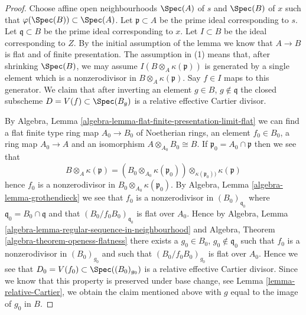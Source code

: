 \begin{proof}
Choose affine open neighbourhoods $\Spec(A)$ of $s$ and
$\Spec(B)$ of $x$ such that
$\varphi(\Spec(B)) \subset \Spec(A)$.
Let $\mathfrak p \subset A$ be the prime ideal corresponding to $s$.
Let $\mathfrak q \subset B$ be the prime ideal corresponding to $x$.
Let $I \subset B$ be the ideal corresponding to $Z$.
By the initial assumption of the lemma we know that
$A \to B$ is flat and of finite presentation.
The assumption in (1) means that, after shrinking $\Spec(B)$, we may
assume $I(B \otimes_A \kappa(\mathfrak p))$ is generated by a single
element which is a nonzerodivisor in $B \otimes_A \kappa(\mathfrak p)$.
Say $f \in I$ maps to this generator. We claim that after inverting
an element $g \in B$, $g \not \in \mathfrak q$ the closed subscheme
$D = V(f) \subset \Spec(B_g)$ is a relative effective Cartier
divisor.

\medskip\noindent
By
Algebra, Lemma \ref{algebra-lemma-flat-finite-presentation-limit-flat}
we can find a flat finite type ring map $A_0 \to B_0$ of Noetherian
rings, an element $f_0 \in B_0$, a ring map $A_0 \to A$ and an isomorphism
$A \otimes_{A_0} B_0 \cong B$. If $\mathfrak p_0 = A_0 \cap \mathfrak p$
then we see that
$$
B \otimes_A \kappa(\mathfrak p) =
\left(B_0 \otimes_{A_0} \kappa(\mathfrak p_0)\right)
\otimes_{\kappa(\mathfrak p_0))} \kappa(\mathfrak p)
$$
hence $f_0$ is a nonzerodivisor in $B_0 \otimes_{A_0} \kappa(\mathfrak p_0)$.
By
Algebra, Lemma \ref{algebra-lemma-grothendieck}
we see that $f_0$ is a nonzerodivisor in $(B_0)_{\mathfrak q_0}$
where $\mathfrak q_0 = B_0 \cap \mathfrak q$ and
that $(B_0/f_0B_0)_{\mathfrak q_0}$ is flat over $A_0$. Hence by
Algebra, Lemma \ref{algebra-lemma-regular-sequence-in-neighbourhood}
and
Algebra, Theorem \ref{algebra-theorem-openess-flatness}
there exists a $g_0 \in B_0$, $g_0 \not \in \mathfrak q_0$ such
that $f_0$ is a nonzerodivisor in $(B_0)_{g_0}$ and such that
$(B_0/f_0B_0)_{g_0}$ is flat over $A_0$. Hence we see that
$D_0 = V(f_0) \subset \Spec((B_0)_{g_0})$ is a relative effective
Cartier divisor. Since we know that this property is preserved under
base change, see
Lemma \ref{lemma-relative-Cartier},
we obtain the claim mentioned above with $g$ equal to the image of $g_0$
in $B$.


\end{proof}
